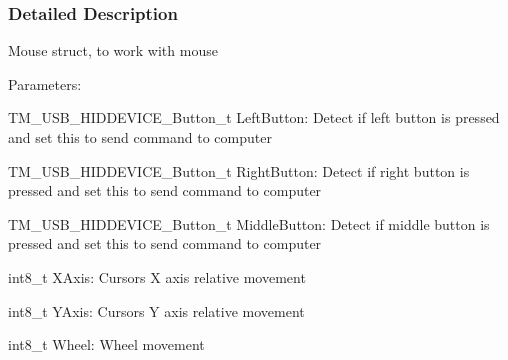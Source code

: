\subsubsection{Detailed Description}
Mouse struct, to work with mouse

Parameters\+:
\begin{DoxyItemize}
\item T\+M\+\_\+\+U\+S\+B\+\_\+\+H\+I\+D\+D\+E\+V\+I\+C\+E\+\_\+\+Button\+\_\+t Left\+Button\+: Detect if left button is pressed and set this to send command to computer
\item T\+M\+\_\+\+U\+S\+B\+\_\+\+H\+I\+D\+D\+E\+V\+I\+C\+E\+\_\+\+Button\+\_\+t Right\+Button\+: Detect if right button is pressed and set this to send command to computer
\item T\+M\+\_\+\+U\+S\+B\+\_\+\+H\+I\+D\+D\+E\+V\+I\+C\+E\+\_\+\+Button\+\_\+t Middle\+Button\+: Detect if middle button is pressed and set this to send command to computer
\item int8\+\_\+t X\+Axis\+: Cursor\textquotesingle{}s X axis relative movement
\item int8\+\_\+t Y\+Axis\+: Cursor\textquotesingle{}s Y axis relative movement
\item int8\+\_\+t Wheel\+: Wheel movement 
\end{DoxyItemize}